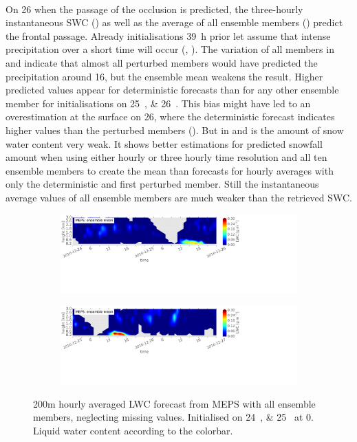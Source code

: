 \\ 
On \SI{26}{\dec} when the passage of the occlusion is predicted, the three-hourly instantaneous SWC () as well as the average of all ensemble members () predict the frontal passage. 
Already initialisations \SI{39}{\hour} prior let assume that intense precipitation over a short time will occur (, ). The variation of all members in  and  indicate that almost all perturbed members would have predicted the precipitation around \SI{16}{\UTC}, but the ensemble mean weakens the result. Higher predicted values appear for deterministic forecasts than for any other ensemble member for initialisations on \SIlist{25;26}{\dec}. This bias might have led to an overestimation at the surface on \SI{26}{\dec}, where the deterministic forecast indicates higher values than the perturbed members ().  But in  and  is the amount of snow water content very weak. 
It shows better estimations for predicted snowfall amount when using either hourly or three hourly time resolution and all ten ensemble members to create the mean than forecasts for hourly averages with only the deterministic and first perturbed member.
Still the instantaneous average values of all ensemble members are much weaker than the retrieved SWC.
\\
\begin{figure}[t]
	\centering
	\begin{subfigure}[b]{\textwidth}
		\centering
		\includegraphics[trim={0.cm 11.5cm 18.5cm 0.4cm},clip,width=\textwidth]{./fig_vert_LWC_EM/20161224}
		\caption{}\label{fig:LWC:24}
	\end{subfigure}
	\begin{subfigure}[b]{\textwidth}
		\centering
		\includegraphics[trim={0.cm 10cm 18.5cm 0.4cm},clip,width=\textwidth]{./fig_vert_LWC_EM/20161225}
		\caption{}\label{fig:LWC:25}
	\end{subfigure}
	\caption{200m hourly averaged LWC forecast from MEPS with all ensemble members, neglecting missing values.
		Initialised on \SIlist{24;25}{\dec} at \SI{0}{\UTC}. Liquid water content according to the colorbar.}\label{fig:LWC:2425}
\end{figure}
